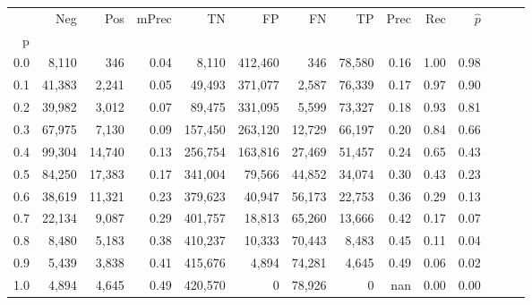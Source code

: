 \begin{tabular}{rrrrrrrrrrrrrr}
\toprule
{} &     Neg &     Pos & mPrec &       TN &       FP &      FN &      TP &  Prec &   Rec & $\hat{p}$ \\
p   &         &         &       &          &          &         &         &       &       &           \\
\midrule
0.0 &   8,110 &     346 &  0.04 &    8,110 &  412,460 &     346 &  78,580 &  0.16 &  1.00 &      0.98 \\
0.1 &  41,383 &   2,241 &  0.05 &   49,493 &  371,077 &   2,587 &  76,339 &  0.17 &  0.97 &      0.90 \\
0.2 &  39,982 &   3,012 &  0.07 &   89,475 &  331,095 &   5,599 &  73,327 &  0.18 &  0.93 &      0.81 \\
0.3 &  67,975 &   7,130 &  0.09 &  157,450 &  263,120 &  12,729 &  66,197 &  0.20 &  0.84 &      0.66 \\
0.4 &  99,304 &  14,740 &  0.13 &  256,754 &  163,816 &  27,469 &  51,457 &  0.24 &  0.65 &      0.43 \\
0.5 &  84,250 &  17,383 &  0.17 &  341,004 &   79,566 &  44,852 &  34,074 &  0.30 &  0.43 &      0.23 \\
0.6 &  38,619 &  11,321 &  0.23 &  379,623 &   40,947 &  56,173 &  22,753 &  0.36 &  0.29 &      0.13 \\
0.7 &  22,134 &   9,087 &  0.29 &  401,757 &   18,813 &  65,260 &  13,666 &  0.42 &  0.17 &      0.07 \\
0.8 &   8,480 &   5,183 &  0.38 &  410,237 &   10,333 &  70,443 &   8,483 &  0.45 &  0.11 &      0.04 \\
0.9 &   5,439 &   3,838 &  0.41 &  415,676 &    4,894 &  74,281 &   4,645 &  0.49 &  0.06 &      0.02 \\
1.0 &   4,894 &   4,645 &  0.49 &  420,570 &        0 &  78,926 &       0 &   nan &  0.00 &      0.00 \\
\bottomrule
\end{tabular}
